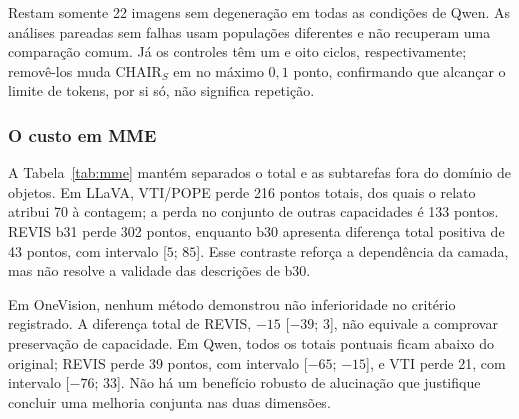 Restam somente 22 imagens sem degeneração em todas as condições de Qwen. As análises pareadas sem falhas usam populações diferentes e não recuperam uma comparação comum. Já os controles têm um e oito ciclos, respectivamente; removê-los muda CHAIR$_S$ em no máximo $0{,}1$ ponto, confirmando que alcançar o limite de tokens, por si só, não significa repetição.

\subsubsection{O custo em MME}

A Tabela~\ref{tab:mme} mantém separados o total e as subtarefas fora do domínio de objetos. Em LLaVA, VTI/POPE perde 216 pontos totais, dos quais o relato atribui 70 à contagem; a perda no conjunto de outras capacidades é 133 pontos. REVIS b31 perde 302 pontos, enquanto b30 apresenta diferença total positiva de 43 pontos, com intervalo [$5$; $85$]. Esse contraste reforça a dependência da camada, mas não resolve a validade das descrições de b30.

Em OneVision, nenhum método demonstrou não inferioridade no critério registrado. A diferença total de REVIS, $-15$ [$-39$; $3$], não equivale a comprovar preservação de capacidade. Em Qwen, todos os totais pontuais ficam abaixo do original; REVIS perde 39 pontos, com intervalo [$-65$; $-15$], e VTI perde 21, com intervalo [$-76$; $33$]. Não há um benefício robusto de alucinação que justifique concluir uma melhoria conjunta nas duas dimensões.

